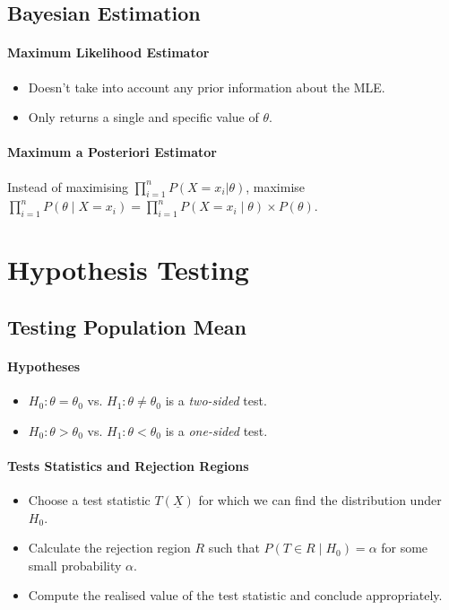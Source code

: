 \documentclass[twocolumn,english]{article}
\begin{document}
\subsection{Bayesian Estimation}

\paragraph{Maximum Likelihood Estimator}
\begin{itemize}
\item Doesn't take into account any prior information about the MLE.
\item Only returns a single and specific value of $\theta$.
\end{itemize}

\paragraph{Maximum a Posteriori Estimator}

Instead of maximising $\prod_{i=1}^{n}P\left(X=x_{i}|\theta\right)$,
maximise $\prod_{i=1}^{n}P\left(\theta\mid X=x_{i}\right)=\prod_{i=1}^{n}P\left(X=x_{i}\mid\theta\right)\times P\left(\theta\right)$.

\section{Hypothesis Testing}

\subsection{Testing Population Mean}

\paragraph{Hypotheses}
\begin{itemize}
\item $H_{0}:\theta=\theta_{0}$ vs. $H_{1}:\theta\neq\theta_{0}$ is a
\emph{two-sided} test.
\item $H_{0}:\theta>\theta_{0}$ vs. $H_{1}:\theta<\theta_{0}$ is a \emph{one-sided}
test.
\end{itemize}

\paragraph{Tests Statistics and Rejection Regions}
\begin{itemize}
\item Choose a test statistic $T\left(\underline{X}\right)$ for which we
can find the distribution under $H_{0}$.
\item Calculate the rejection region $R$ such that $P\left(T\in R\mid H_{0}\right)=\alpha$
for some small probability $\alpha$.
\item Compute the realised value of the test statistic and conclude appropriately.
\end{itemize}
\end{document}
